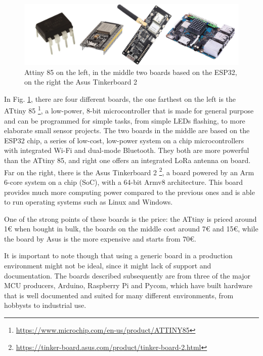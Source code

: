 		\begin{figure}[H]
			\centering
			\includegraphics[width=\textwidth]{resources/img/chap3/generic_board}
			\caption{Attiny 85 on the left, in the middle two boards based on the ESP32, on the right the Asus Tinkerboard 2}
			\label{img:generic_board}
		\end{figure}
	
		In Fig. \ref{img:generic_board}, there are four different boards, the one farthest on the left is the ATtiny 85 \footnote{\url{https://www.microchip.com/en-us/product/ATTINY85}}, a low-power, 8-bit microcontroller that is made for general purpose and can be programmed for simple tasks, from simple LEDs flashing, to more elaborate small sensor projects.
		The two boards in the middle are based on the ESP32 chip, a series of low-cost, low-power system on a chip microcontrollers with integrated Wi-Fi and dual-mode Bluetooth.
		They both are more powerful than the ATtiny 85, and right one offers an integrated LoRa antenna on board.
		Far on the right, there is the Asus Tinkerboard 2 \footnote{\url{https://tinker-board.asus.com/product/tinker-board-2.html}}, a board powered by an Arm 6-core system on a chip (SoC), with a 64-bit Armv8 architecture.
		This board provides much more computing power compared to the previous ones and is able to run operating systems such as Linux and Windows.
		
		One of the strong points of these boards is the price: the ATtiny is priced around 1€ when bought in bulk, the boards on the middle cost around 7€ and 15€, while the board by Asus is the more expensive and starts from 70€.
		
		It is important to note though that using a generic board in a production environment might not be ideal, since it might lack of support and documentation.
		The boards described subsequently are from three of the major MCU producers, Arduino, Raspberry Pi and Pycom, which have built hardware that is well documented and suited for many different environments, from hobbysts to industrial use.
		
